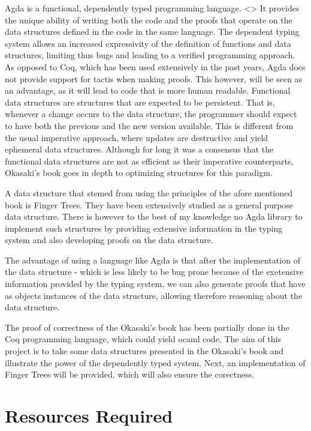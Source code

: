 \documentclass[12pt]{article}
\begin{document}
Agda is a functional, dependently typed programming language.
<>
It provides the unique ability of writing both the code and the proofs
that operate on the data structures defined in the code in the same language.
The dependent typing system allows an increased expressivity of the definition
of functions and data structures, limiting thus bugs and leading to a verified
programming approach.
As opposed to Coq, which has been used extensively in the past years, Agda
does not provide support for tactis when making proofs. This however, will be
seen as an advantage, as it will lead to code that is more human readable.
Functional data structures are structures that are expected to be persistent. That is,
whenever a change occurs to the data structure, the programmer should expect to have
both the previous and the new version available. This is different from the usual
imperative approach, where updates are destructive and yield ephemeral data structures.
Although for long it was a consensus that the functional data structures are not
as efficient as their imperative counterparts, Okasaki's book goes in depth to
optimizing structures for this paradigm.

A data structure that stemed from using the principles of the
afore mentioned book is Finger Trees. They have been extensively studied
as a general purpose data structure.
There is however to the best of my knowledge no Agda library to implement
such structures by providing extensive information in the typing system and
also developing proofs on the data structure.

The advantage of using a language like Agda is that after the implementation of
the data structure - which is less likely to be bug prone because of the 
exetensive information provided by the typing system, we can also generate
proofs that have as objects instances of the data structure, allowing therefore
reasoning about the data structure.

The proof of correctness of the Okasaki's book has been partially done in the
Coq programming language, which could yield ocaml code.
The aim of this project is to take some data structures presented in the Okasaki's
book and illustrate the power of the dependently typed system. Next, an implementation
of Finger Trees will be provided, which will also ensure the corectness.



\section*{Resources Required}
\end{document}

